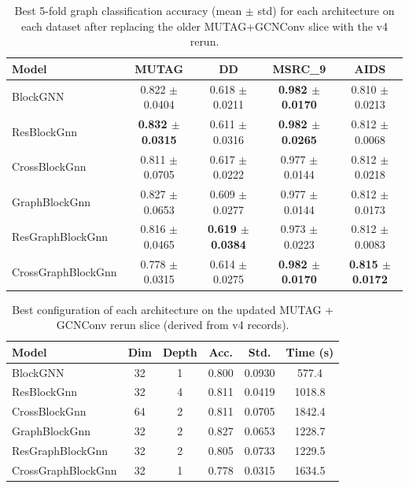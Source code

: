 \begin{table}[t]
\centering
\caption{Best 5-fold graph classification accuracy (mean $\pm$ std) for each architecture on each dataset after replacing the older MUTAG+GCNConv slice with the v4 rerun.}
\label{tab:main_results}
\begin{tabular}{lcccc}
\toprule
Model & MUTAG & DD & MSRC\_9 & AIDS \\
\midrule
BlockGNN & 0.822 $\pm$ 0.0404 & 0.618 $\pm$ 0.0211 & \textbf{0.982 $\pm$ 0.0170} & 0.810 $\pm$ 0.0213 \\
ResBlockGnn & \textbf{0.832 $\pm$ 0.0315} & 0.611 $\pm$ 0.0316 & \textbf{0.982 $\pm$ 0.0265} & 0.812 $\pm$ 0.0068 \\
CrossBlockGnn & 0.811 $\pm$ 0.0705 & 0.617 $\pm$ 0.0222 & 0.977 $\pm$ 0.0144 & 0.812 $\pm$ 0.0218 \\
GraphBlockGnn & 0.827 $\pm$ 0.0653 & 0.609 $\pm$ 0.0277 & 0.977 $\pm$ 0.0144 & 0.812 $\pm$ 0.0173 \\
ResGraphBlockGnn & 0.816 $\pm$ 0.0465 & \textbf{0.619 $\pm$ 0.0384} & 0.973 $\pm$ 0.0223 & 0.812 $\pm$ 0.0083 \\
CrossGraphBlockGnn & 0.778 $\pm$ 0.0315 & 0.614 $\pm$ 0.0275 & \textbf{0.982 $\pm$ 0.0170} & \textbf{0.815 $\pm$ 0.0172} \\
\bottomrule
\end{tabular}
\end{table}

\begin{table}[t]
\centering
\caption{Best configuration of each architecture on the updated MUTAG + GCNConv rerun slice (derived from v4 records).}
\label{tab:ablation}
\begin{tabular}{lccccc}
\toprule
Model & Dim & Depth & Acc. & Std. & Time (s) \\
\midrule
BlockGNN & 32 & 1 & 0.800 & 0.0930 & 577.4 \\
ResBlockGnn & 32 & 4 & 0.811 & 0.0419 & 1018.8 \\
CrossBlockGnn & 64 & 2 & 0.811 & 0.0705 & 1842.4 \\
GraphBlockGnn & 32 & 2 & 0.827 & 0.0653 & 1228.7 \\
ResGraphBlockGnn & 32 & 2 & 0.805 & 0.0733 & 1229.5 \\
CrossGraphBlockGnn & 32 & 1 & 0.778 & 0.0315 & 1634.5 \\
\bottomrule
\end{tabular}
\end{table}

